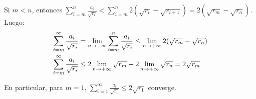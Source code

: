 {\begin{enumerate}[a)]
			Si $m<n$, entonces $\sum_{i=m}^{n}\frac{a_i}{\sqrt{r_i}} < \sum_{i=m}^{n} 2(\sqrt{r_i}-\sqrt{r_{i+1}}) = 2(\sqrt{r_m}-\sqrt{r_n})$.
			Luego:
			\begin{align*}
				\sum_{i=m}^{\infty}\frac{a_i}{\sqrt{r_i}}
					&= \limite{n}{\sum_{i=m}^{n}\frac{a_i}{\sqrt{r_i}}}
					\leq \limite{n}{2(\sqrt{r_m}-\sqrt{r_n})}
				\\
				\sum_{i=m}^{\infty}\frac{a_i}{\sqrt{r_i}}
					&\leq 2\limite{n}{\sqrt{r_m}} - 2\limite{n}{\sqrt{r_n}}
					= 2\sqrt{r_m}
			\end{align*}

			En particular, para $m=1$, $\sum_{i=1}^{\infty}\frac{a_i}{\sqrt{r_i}} \leq 2\sqrt{r_1}$ converge.

	\end{enumerate}
}